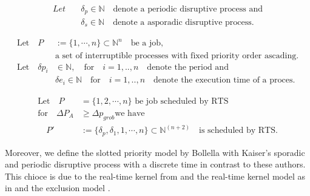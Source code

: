	\begin{definition}
		\begin{subequations}     
			\begin{align} 
				Let \quad & \delta_p \in \mathbb{N} \quad \text{denote a periodic disruptive process and}\\
	 	&\delta_s \in \mathbb{N} \quad \text{denote a asporadic disruptive process.}
	 		\end{align}
		\end{subequations}
	\end{definition}
	 	
	\begin{definition}
	 	\begin{subequations}
	 		\begin{align}
	 \text{Let} \quad P& := \{1, \cdots, n \} \subset \mathbb{N}^n \quad \text{be a job,}\\
	  &\text{a set of interruptible processes with fixed priority order ascading.} \\
	 	\text{Let} \quad \delta p_i &\in \mathbb{N}, \quad \text{for} \quad i = 1,..,n \quad  \text{denote the period and}  \\
	 	&\delta e_i  \in \mathbb{N} \quad \text{for} \quad  i = 1,..,n \quad  \text{denote the execution time of a proces}.  
	 		\end{align}   
	 	\end{subequations}
	\end{definition}
	
	\begin{theorem}
	 	\begin{subequations}
	 		\begin{align}
	 		\text{Let} \quad P &=\{1, 2, \cdots,n \} \text{ be job scheduled by RTS} \\
	 		\text{for} \quad \Delta P_A & \geq  \Delta p_{grob} \text{we have}\\
	        \quad P' &:= \{\delta_p, \delta_1, 1, \cdots, n \} \subset \mathbb{N}^{(n+2)} \quad \text{is scheduled by RTS}.
	  		\end{align}   
	 	\end{subequations}
	\end{theorem}
	
	Moreover, we define the slotted priority model by Bollella with Kaiser's sporadic and periodic disruptive process with a discrete time in contrast to these authors.
	This chioce is due to the real-time kernel from \cite{PROSA_schedubility_analysis} and the real-time kernel model as in \cite[chp. 5.3]{B97} and the exclusion model \cite[p.12]{B97}.
	

